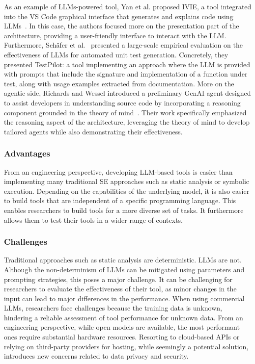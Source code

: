 As an example of LLMs-powered tool, Yan et al. proposed IVIE, a tool integrated into the VS Code graphical interface that generates and explains code using LLMs~\cite{DBLP:conf/chi/YanHWH24}. In this case, the authors focused more on the presentation part of the architecture, providing a user-friendly interface to interact with the LLM. 
Furthermore, Sch{\"{a}}fer et al.~\cite{DBLP:journals/tse/SchaferNET24} presented a large-scale empirical evaluation on the effectiveness of LLMs for automated unit test generation. Concretely, they presented TestPilot: a tool implementing an approach where the LLM is provided with prompts that include the signature and implementation of a function under test, along with usage examples extracted from documentation.
More on the agentic side, Richards and Wessel introduced a preliminary GenAI agent designed to assist developers in understanding source code by incorporating a reasoning component grounded in the theory of mind~\cite{DBLP:conf/icsm/RichardsW24}. Their work specifically emphasized the reasoning aspect of the architecture, leveraging the theory of mind to develop tailored agents while also demonstrating their effectiveness.

\subsubsection{Advantages}

From an engineering perspective, developing LLM-based tools is easier than implementing many traditional SE approaches such as static analysis or symbolic execution.
Depending on the capabilities of the underlying model, it is also easier to build tools that are independent of a specific programming language.
This enables researchers to build tools for a more diverse set of tasks.
It furthermore allows them to test their tools in a wider range of contexts.

\subsubsection{Challenges}

Traditional approaches such as static analysis are deterministic. LLMs are not.
Although the non-determinism of LLMs can be mitigated using parameters and prompting strategies, this poses a major challenge.
It can be challenging for researchers to evaluate the effectiveness of their tool, as minor changes in the input can lead to major differences in the performance.
When using commercial LLMs, researchers face challenges because the training data is unknown, hindering a reliable assessment of tool performance for unknown data.
From an engineering perspective, while open models are available, the most performant ones require substantial hardware resources.
Resorting to cloud-based APIs or relying on third-party providers for hosting, while seemingly a potential solution, introduces new concerns related to data privacy and security.


